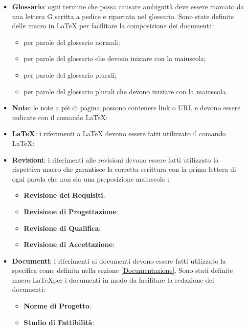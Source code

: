 \documentclass[12pt,a4paper]{article}
\begin{document}
\begin{itemize}
	\item \textbf{Glossario}: ogni termine che possa causare ambiguità deve essere marcato da una lettera G scritta a pedice e riportata nel glossario. Sono state definite delle macro in \LaTeX{} per facilitare la composizione dei documenti:
	\begin{itemize}
		\item {} per parole del glossario normali;
		\item {} per parole del glossario che devono iniziare con la maiuscola;
		\item {} per parole del glossario plurali;
		\item {} per parole del glossario plurali che devono iniziare con la maiuscola.
	\end{itemize}
	\item \textbf{Note}: le note a piè di pagina possono contenere link o URL e devono essere indicate con il comando \LaTeX: 
	\item \textbf{\LaTeX}: i riferimenti a \LaTeX{} devono essere fatti utilizzato il comando \LaTeX: 
	\item \textbf{Revisioni}: i riferimenti alle revisioni devono essere fatti utilizzato la rispettiva macro che garantisce la corretta scrittura con la prima lettera di ogni parola che non sia una preposizione maiuscola :
	\begin{itemize}
		\item \textbf{Revisione dei Requisiti}: 
		\item \textbf{Revisione di Progettazione}: 
		\item \textbf{Revisione di Qualifica}: 
		\item \textbf{Revisione di Accettazione}: 
	\end{itemize}
	\item \textbf{Documenti}: i riferimenti ai documenti devono essere fatti utilizzato la specifica come definita nella sezione \ref{Documentazione}. Sono stati definite macro  \LaTeX per i documenti in modo da facilitare la redazione dei documenti:
	\begin{itemize}
		\item \textbf{Norme di Progetto}: 
		\item \textbf{Studio di Fattibilità}: 

\end{itemize}
\end{itemize}
\end{document}
